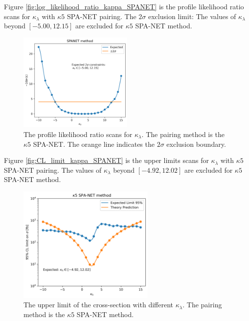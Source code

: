 \documentclass[12pt]{article}
\begin{document}
		Figure \ref{fig:log_likelihood_ratio_kappa_SPANET} is the profile likelihood ratio scans for $\kappa_\lambda$ with $\kappa 5$ SPA-NET pairing. The $2\sigma$ exclusion limit: The values of $\kappa_\lambda$ beyond $\left[ -5.00, 12.15 \right]$ are excluded for $\kappa 5$ SPA-NET method.

		\begin{figure}[htpb]
			\centering
			\includegraphics[width=0.5\textwidth]{log_likelihood_ratio_kappa_SPANET-k5.png}
			\caption{The profile likelihood ratio scans for $\kappa_\lambda$. The pairing method is the $\kappa 5$ SPA-NET. The orange line indicates the $2\sigma$ exclusion boundary.}
			\label{fig:log_likelihood_ratio_kappa_SPANET-k5}
		\end{figure}

		Figure \ref{fig:CL_limit_kappa_SPANET} is the upper limits scans for $\kappa_\lambda$ with $\kappa 5$ SPA-NET pairing. The values of $\kappa_\lambda$ beyond $\left[ -4.92, 12.02 \right]$ are excluded for $\kappa 5$ SPA-NET method.
		\begin{figure}[htpb]
			\centering
			\includegraphics[width=0.6\textwidth]{CL_limit_kappa_SPANET-k5.png}
			\caption{The upper limit of the cross-section with different $\kappa_\lambda$. The pairing method is the $\kappa 5$ SPA-NET method.}
			\label{fig:CL_limit_kappa_SPANET-k5}
		\end{figure}
\end{document}
